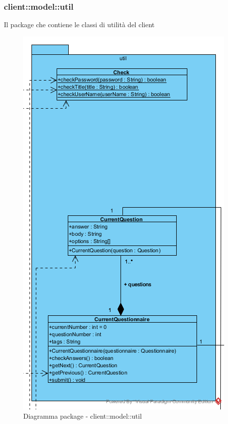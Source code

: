 \subsubsection{client::model::util}
Il package che contiene le classi di utilità del client\begin{center}
		\begin{figure}[H]
			\centering \includegraphics[scale=4, max width=\textwidth, max height=\myheight]{../img/diagrammiClassi/client/model/util.png}
			\caption{Diagramma package - client::model::util}
		\end{figure}
	\end{center}\hypertarget{client::model::util::Check}{}
